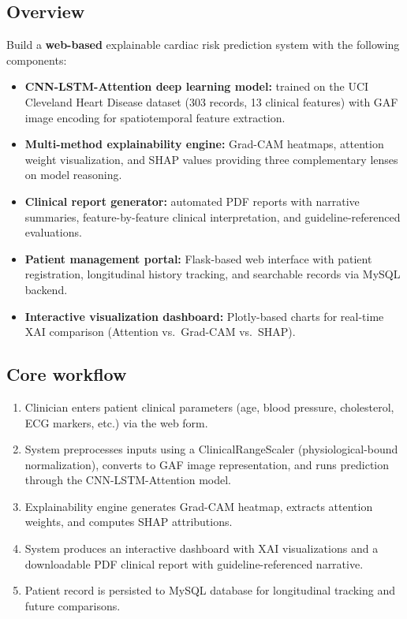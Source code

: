 \documentclass[11pt,a4paper]{article}
\begin{document}
\subsection{Overview}
Build a \textbf{web-based} explainable cardiac risk prediction
system with the following components:
\begin{itemize}[leftmargin=0.7cm]
    \item \textbf{CNN-LSTM-Attention deep learning model:} trained
      on the UCI Cleveland Heart Disease dataset (303 records,
      13 clinical features) with GAF image encoding for
      spatiotemporal feature extraction.
    \item \textbf{Multi-method explainability engine:} Grad-CAM
      heatmaps, attention weight visualization, and SHAP values
      providing three complementary lenses on model reasoning.
    \item \textbf{Clinical report generator:} automated PDF reports
      with narrative summaries, feature-by-feature clinical
      interpretation, and guideline-referenced evaluations.
    \item \textbf{Patient management portal:} Flask-based web
      interface with patient registration, longitudinal history
      tracking, and searchable records via MySQL backend.
    \item \textbf{Interactive visualization dashboard:} Plotly-based
      charts for real-time XAI comparison (Attention vs.\ Grad-CAM
      vs.\ SHAP).
\end{itemize}

\subsection{Core workflow}
\begin{enumerate}[leftmargin=0.7cm]
    \item Clinician enters patient clinical parameters (age, blood
      pressure, cholesterol, ECG markers, etc.) via the web form.
    \item System preprocesses inputs using a ClinicalRangeScaler
      (physiological-bound normalization), converts to GAF image
      representation, and runs prediction through the
      CNN-LSTM-Attention model.
    \item Explainability engine generates Grad-CAM heatmap,
      extracts attention weights, and computes SHAP attributions.
    \item System produces an interactive dashboard with XAI
      visualizations and a downloadable PDF clinical report with
      guideline-referenced narrative.
    \item Patient record is persisted to MySQL database for
      longitudinal tracking and future comparisons.
\end{enumerate}
\end{document}
